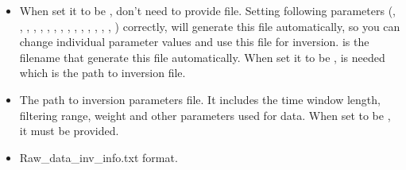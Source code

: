 \documentclass[a4paper,10pt,english,openany]{sphinxmanual}
\begin{document}
\begin{itemize}
\item {} 
When set it to be , don’t need to provide  file. Setting following parameters
(,
,
,
,
,
,
,
,
,
,
,
,
,
,
,
)
correctly,  will generate this file automatically, so you can change individual parameter values
and use this file for inversion.  is the filename that generate this file automatically.
When set it to be ,  is needed which is the path to inversion file.

\end{itemize}

\begin{itemize}
\item {} 
The path to inversion parameters file. It includes the time window length, filtering range, weight
and other parameters used for data. When set  to be , it must be provided.

\item {} 
Raw\_data\_inv\_info.txt format.

\end{itemize}
\end{document}
